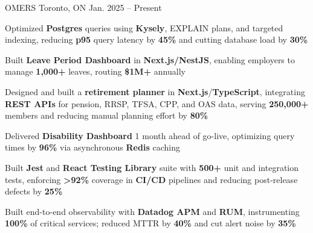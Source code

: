 \documentclass[11pt, a4paper]{awesome-cv}
\begin{document}
\makecvheader[C]


\begin{cventries}


  \cventry
    {\color{lightblue}{ASSOCIATE FULL-STACK ENGINEER}}
    {OMERS}
    {Toronto, ON}
    {Jan. 2025 -- Present}
    {
      \begin{cvitems}
        \item{Optimized \textbf{Postgres} queries using \textbf{Kysely}, EXPLAIN plans, and targeted indexing, reducing \textbf{p95} query latency by \textbf{45\%} and cutting database load by \textbf{30\%}}
        \item{Built \textbf{Leave Period Dashboard} in \textbf{Next.js/NestJS}, enabling employers to manage \textbf{1,000+} leaves, routing \textbf{\$1M+} annually}
        \item{Designed and built a \textbf{retirement planner} in \textbf{Next.js}/\textbf{TypeScript}, integrating \textbf{REST APIs} for pension, RRSP, TFSA, CPP, and OAS data, serving \textbf{250,000+} members and reducing manual planning effort by \textbf{80\%}}
        \item{Delivered \textbf{Disability Dashboard} 1 month ahead of go-live, optimizing query times by \textbf{96\%} via asynchronous \textbf{Redis} caching}
        \item{Built \textbf{Jest} and \textbf{React Testing Library} suite with \textbf{500+} unit and integration tests, enforcing \textbf{>92\%} coverage in \textbf{CI/CD} pipelines and reducing post-release defects by \textbf{25\%}}
        \item{Built end-to-end observability with \textbf{Datadog APM} and \textbf{RUM}, instrumenting \textbf{100\%} of critical services; reduced MTTR by \textbf{40\%} and cut alert noise by \textbf{35\%}}
      \end{cvitems}
    }

  \vspace{3mm}


\end{cventries}
\end{document}
